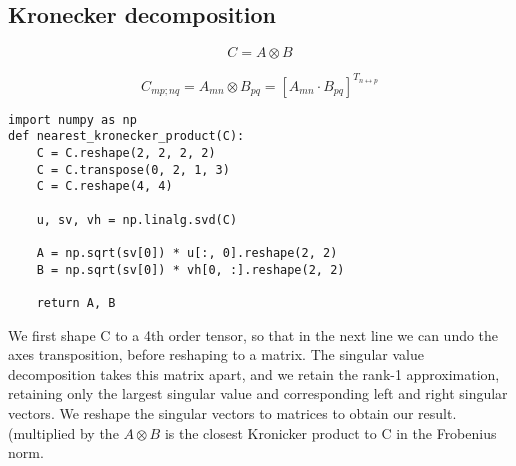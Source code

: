 
\subsection{Kronecker decomposition}
\cite{VanLoan1993a, VanLoan2000a}

\[
C = A\otimes B
\]

\[
C_{mp;nq} = A_{mn}\otimes B_{pq} = [A_{mn}\cdot B_{pq}]^{T_{n\leftrightarrow p}} 
\]

\begin{verbatim}
import numpy as np
def nearest_kronecker_product(C):
    C = C.reshape(2, 2, 2, 2)
    C = C.transpose(0, 2, 1, 3)  
    C = C.reshape(4, 4)

    u, sv, vh = np.linalg.svd(C)
    
    A = np.sqrt(sv[0]) * u[:, 0].reshape(2, 2)
    B = np.sqrt(sv[0]) * vh[0, :].reshape(2, 2)

    return A, B
\end{verbatim}
We first shape C to a 4th order tensor, so that in the next line we can undo the axes transposition, before reshaping to a matrix. The singular value decomposition takes this matrix apart, and we retain the rank-1 approximation, retaining only the largest singular value and corresponding left and right singular vectors. We reshape the singular vectors to matrices to obtain our result. (multiplied by the   
$A\otimes B$ is the closest Kronicker product to C in the Frobenius norm.

